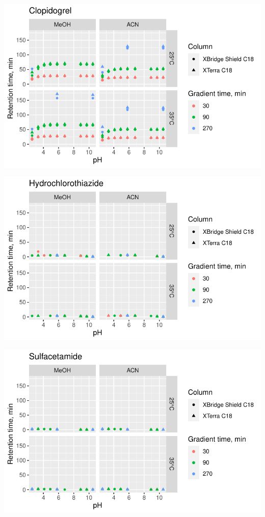 \documentclass[
  letterpaper,
  DIV=11,
  numbers=noendperiod]{scrreprt}
\begin{document}
\includegraphics{index_files/figure-pdf/unnamed-chunk-4-57.pdf}

\includegraphics{index_files/figure-pdf/unnamed-chunk-4-58.pdf}

\includegraphics{index_files/figure-pdf/unnamed-chunk-4-59.pdf}
\end{document}
